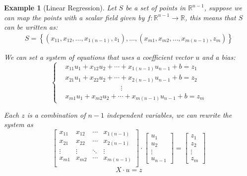 \documentclass{book}
\newtheorem{example}{Example}[chapter]
\begin{document}
\begin{example}[Linear Regression]
    Let $S$ be a set of points in $\mathbb{R}^{n-1}$, suppose we can map the points
    with a scalar field given by $f:\mathbb{R}^{n-1}\to\mathbb{R}$, this means that
    $S$ can be written as:
    \begin{equation}
        \begin{split}
            S = \left\{\left(x_{11},x_{12},\dots,x_{1(n-1)},z_{1} \right), \dots, \left(x_{m1}, x_{m2},\dots,x_{m(n-1)}, z_m\right)\right\}
        \end{split}
    \end{equation}

    We can set a system of equations that uses a coefficient vector $u$ and a
    \textit{bias}:
    \begin{equation}
        \begin{cases}
             & x_{11}u_1 + x_{12}u_2 + \cdots + x_{1(n-1)}u_{n-1} + b = z_1
            \\             & x_{21}u_1 + x_{22}u_2 + \cdots + x_{2(n-1)}u_{n-1} + b = z_2
            \\             & \qquad \qquad \qquad \qquad \vdots
            \\ &x_{m1}u_1 + x_{m2}u_2 + \cdots + x_{m(n-1)}u_{n-1} + b = z_m
        \end{cases}
    \end{equation}

    Each $z$ is a combination of $n-1$ independent variables, we can rewrite the
    system as
    \begin{equation}
        \left[
            \begin{matrix}
                x_{11} & x_{12} & \cdots & x_{1(n-1)} \\
                x_{21} & x_{22} & \cdots & x_{2(n-1)} \\
                \vdots & \vdots & \ddots & \vdots     \\
                x_{m1} & x_{m2} & \cdots & x_{m(n-1)} \\
            \end{matrix}
            \right]\cdot \left[
            \begin{matrix}
                u_1 \\u_2\\\vdots\\u_{n-1}
            \end{matrix}
            \right] = \left[
            \begin{matrix}
                z_1 \\z_2\\\vdots\\z_m
            \end{matrix}
            \right]
    \end{equation}
    \begin{equation*}
        X\cdot u = z
    \end{equation*}


\end{example}
\end{document}
